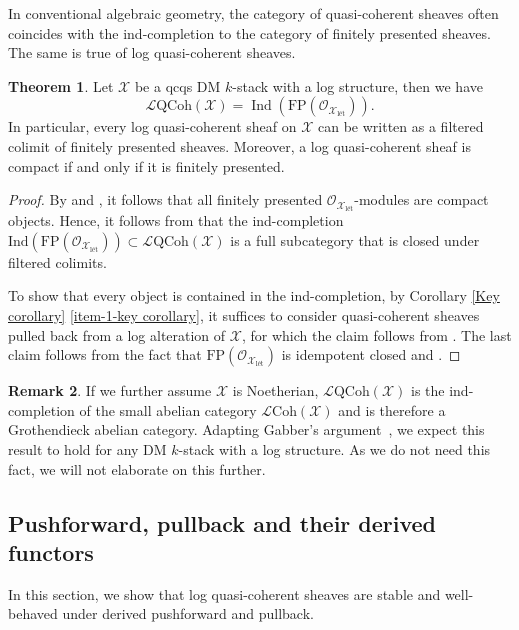 \documentclass[11pt]{amsart}
\theoremstyle{definition}
\theoremstyle{definition}
\newtheorem{theorem}{Theorem}[subsection]
\newtheorem{remark}[theorem]{Remark}
\newcommand{\cL}{\mathcal{L}}
\newcommand{\cX}{\mathcal{X}}
\newcommand{\LogO}[1]{\mathcal{O}_{{#1}_\text{l\'et}}}
\newcommand{\cal}{\mathcal}
\def\cL{{\cal L}}
\def\cX{{\cal X}}
\newcommand{\logqcoh}[1]{\cL \text{QCoh}(#1)}
\newcommand{\logcoh}[1]{\cL \text{Coh}(#1)}
\begin{document}
In conventional algebraic geometry, the category of quasi-coherent sheaves often coincides with the ind-completion to the category of finitely presented sheaves. The same is true of log quasi-coherent sheaves. 
\begin{theorem}\label{theorem-compacted-generateness-of-quasi-coherent}
Let $\mathcal{X}$ be a qcqs DM $k$-stack with a log structure, then we have
 $$\logqcoh{\mathcal{X}} = \operatorname{Ind}(\text{FP}(\LogO{\cX})).$$
 In particular, every log quasi-coherent sheaf on $\mathcal{X}$ can be written as a filtered colimit of finitely presented sheaves. Moreover, a log quasi-coherent sheaf is compact if and only if it is finitely presented. 
\end{theorem}
\begin{proof}
By \cite[0GN0, 0GMS (3)]{stacks} and \cite[Lemma 3.14 (1)]{Log-etale-cohomology-Chikara-Nakayama}, it follows that all finitely presented $\mathcal{O}_{\mathcal{X}_{\text{l\'et}}}$-modules are compact objects. Hence, it follows from \cite[Propositions I.8.5.1, I.8.7.3, and I.8.7.5 (a)]{SGA4} that the ind-completion $\text{Ind}(\text{FP}(\LogO{\cX}))\subset \logqcoh{\mathcal{X}}$ is a full subcategory that is closed under filtered colimits. 

To show that every object is contained in the ind-completion, by Corollary \ref{Key corollary} \eqref{item-1-key corollary}, it suffices to consider quasi-coherent sheaves pulled back from a log alteration of $\mathcal{X}$, for which the claim follows from \cite[Corollary 4.11]{rydh2015Noetherian}. The last claim follows from the fact that $\text{FP}(\LogO{\cX})$ is idempotent closed and \cite[Exercise I. 8.7.8]{SGA4}. 
\end{proof}
\begin{remark}
If we further assume $\mathcal{X}$ is Noetherian, $\logqcoh{\mathcal{X}}$ is the ind-completion of the small abelian category $\logcoh{\mathcal{X}}$ and is therefore a Grothendieck abelian category. Adapting Gabber's argument~\cite[077K]{stacks}, we expect this result to hold for any DM $k$-stack with a log structure. As we do not need this fact, we will not elaborate on this further.
\end{remark}
\subsection{Pushforward, pullback and their derived functors}
In this section, we show that log quasi-coherent sheaves are stable and well-behaved under derived pushforward and pullback.
\end{document}
